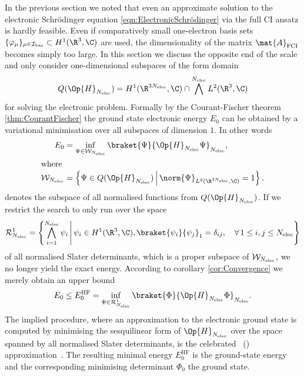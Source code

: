 In the previous section we noted that even an approximate
solution to the electronic Schrödinger equation \eqref{eqn:ElectronicSchrödinger}
via the full CI ansatz
is hardly feasible.
Even if comparatively small one-electron basis sets
$\{ \varphi_\mu \}_{\mu\in\Ibas} \subset H^1(\R^3,\C)$
are used,
the dimensionality
of the matrix $\mat{A}_\text{FCI}$ becomes simply too large.
In this section we discuss the opposite end of the scale and
only consider one-dimensional subspaces of the form domain
\[ Q(\Op{H}_{\Nelec}) = H^1(\R^{3\Nelec}, \C) \cap \bigwedge^{\Nelec} L^2(\R^3, \C) \]
for solving the electronic problem.
Formally by the Courant-Fischer theorem \eqref{thm:CourantFischer}
the ground state electronic energy $E_0$ can be obtained by
a variational minimisation over all subspaces of dimension $1$.
In other words
\begin{align}
	\label{eqn:GroundStateVariational}
	E_0 &= \inf_{\Psi \in \mathcal{W}_{\Nelec}} \braket{\Psi}{\Op{H}_{\Nelec} \Psi}_{\Nelec}, \\
\intertext{where}
	\label{eqn:NormalisedFormDomain}
	\mathcal{W}_{\Nelec} &= \left\{ \Psi \in Q(\Op{H}_{\Nelec})
	\, \middle| \,
	\norm{\Psi}_{L^2(\R^{3 \Nelec}, \C)} = 1 \right\}.
\end{align}
denotes the subspace of all normalised functions from $Q(\Op{H}_{\Nelec})$.
If we restrict the search to only run over the space
\begin{equation}
	\mathcal{R}^1_{\Nelec} = \left\{ \bigwedge_{i=1}^{\Nelec} \psi_i
	\, \middle| \,
	\psi_i \in H^1(\R^3, \C),
	\braket{\psi_i}{\psi_j}_1 = \delta_{ij},
	\quad \forall \, 1\leq i,j\leq \Nelec
	\right\}
	\label{eqn:RankOneSubspace}
\end{equation}
of all normalised Slater determinants,
which is a proper subspace of $\mathcal{W}_{N_\text{elec}}$,
we no longer yield the exact energy.
According to corollary \vref{cor:Convergence} we merely obtain an upper bound
\begin{equation}
	E_0 \leq E_0^\text{HF} = \inf_{\Phi \in \mathcal{R}^1_{\Nelec}}
	\braket{\Phi}{\Op{H}_{\Nelec} \Phi}_{\Nelec}.
	\label{eqn:HFDeterminant}
\end{equation}
The implied procedure,
where an approximation to the electronic ground state
is computed by minimising the sesquilinear form of $\Op{H}_{\Nelec}$
over the space spanned by all normalised Slater determinants,
is the celebrated ~(\HF) approximation~\cite{Fock1930}.
The resulting minimal energy $E_0^\text{HF}$
is the \HF ground-state energy
and the corresponding minimising determinant
$\Phi_0$ the \HF ground state.

